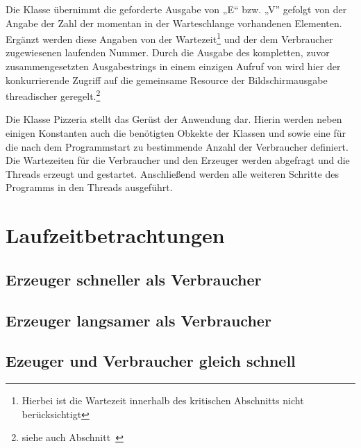 Die Klasse  übernimmt die geforderte Ausgabe von „E“ bzw. „V” gefolgt von der Angabe der Zahl der momentan in der Warteschlange vorhandenen Elementen. Ergänzt werden diese Angaben von der Wartezeit\footnote{Hierbei ist die Wartezeit innerhalb des kritischen Abschnitts nicht berücksichtigt} und der dem Verbraucher zugewiesenen laufenden Nummer. Durch die Ausgabe des kompletten, zuvor zusammengesetzten Ausgabestrings in einem einzigen Aufruf von  wird hier der konkurrierende Zugriff auf die gemeinsame Resource der Bildschirmausgabe threadischer geregelt.\footnote{siehe auch Abschnitt~}

Die Klasse Pizzeria stellt das Gerüst der Anwendung dar. Hierin werden neben einigen Konstanten auch die benötigten Obkekte der Klassen  und  sowie eine  für die nach dem Programmstart zu bestimmende Anzahl der Verbraucher definiert. Die Wartezeiten für die Verbraucher und den Erzeuger werden abgefragt und die Threads erzeugt und gestartet. Anschließend werden alle weiteren Schritte des Programms in den Threads ausgeführt. 

\newpage
\section{Laufzeitbetrachtungen} %
\label{sec:laufzeitbetrachtungen}

\subsection{Erzeuger schneller als Verbraucher} %
\label{sub:erzeuger_schneller_als_verbraucher}


\subsection{Erzeuger langsamer als Verbraucher} %
\label{sub:erzeuger_langsamer_als_verbraucher}


\subsection{Ezeuger und Verbraucher gleich schnell} %
\label{sub:ezeuger_und_verbraucher_gleich_schnell}

